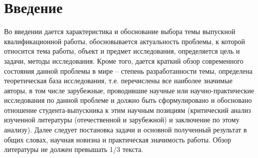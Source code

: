 \chapter*{Введение}

Во введении дается характеристика и обоснование выбора темы выпускной квалификационной работы, обосновывается актуальность проблемы, к которой относится тема работы, объект и предмет исследования, определяется цель и задачи, методы исследования. Кроме того, дается краткий обзор современного состояния данной проблемы в мире – степень разработанности темы, определена теоретическая база исследования, т.е. перечислены все наиболее значимые авторы, в том числе зарубежные, проводившие научные или научно-практические исследования по данной проблеме и должно быть сформулировано и обосновано отношение студента-выпускника к этим научным позициям (критический анализ изученной литературы (отечественной и зарубежной) и заключение по этому анализу). Далее следует постановка задачи и основной полученный результат в общих словах, научная новизна и практическая значимость работы. Обзор литературы не должен превышать 1/3 текста.
